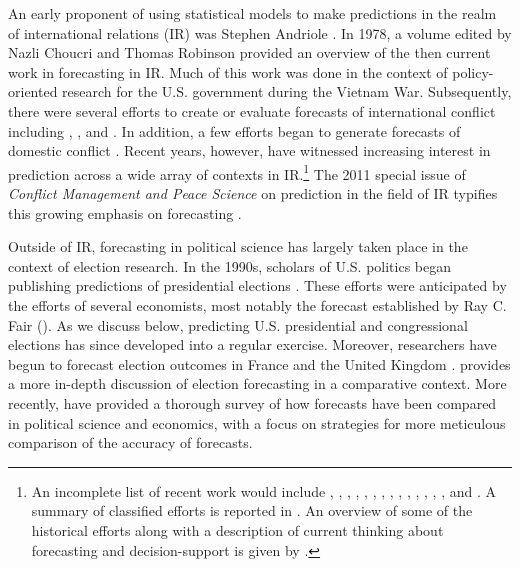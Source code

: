 \documentclass[pdftex,12pt,fullpage,oneside]{amsart}
\begin{document}
An early proponent of using statistical models to make predictions in
the realm of international relations (IR) was Stephen Andriole
\citep{Andriole:Young:1977}. In 1978, a volume edited by Nazli Choucri
and Thomas Robinson \nocite{Choucri:Robinson:1978} provided an
overview of the then current work in forecasting in IR.  Much of this
work was done in the context of policy-oriented research for the
U.S. government during the Vietnam War.  Subsequently, there were 
several efforts to create or evaluate forecasts of international
conflict including \citet{Freeman:Job:1979},
\citet{Singer:Wallace:1979}, and \citet{Vincent:1980}. In
addition, a few efforts began to generate forecasts of domestic
conflict \citep[e.g.,][]{Gurr:Lichbach:1986}.  Recent years,
however, have witnessed increasing interest in prediction across a
wide array of contexts in IR.\footnote{An incomplete list of recent
  work would include \citet{Krause:1997}, \citet{Davies:Gurr:1998},
  \citet{Pevehouse:Goldstein:1999}, \citet{Schrodt:Gerner:2000},
  \citet{King:Zeng:2001}, \citet{OBrien:2002}, \citet{BDM:2002},
  \citet{Fearon:Laitin:2003}, \citet{Demarchi:etal:2004}, \citet{Enders:Sandler:2005},
  \citet{Leblang:Satyanath:2006}, \citet{Ward:etal:2007},
  \citet{Brandt:etal:2008}, \citet{Bennett:Stam:2009}, and
  \citet{Gleditsch:Ward:2010}. A summary of classified efforts is
  reported in \citet{Feder:2002}.  An overview of some of the
  historical efforts along with a description of current thinking
  about forecasting and decision-support is given by
  \citet{OBrien:2010}.}  The 2011 special issue of \emph{Conflict
  Management and Peace Science} on prediction in the field of IR
typifies this growing emphasis on forecasting
\citep[c.f.,][]{Schneider_etal_2011, Mesquita_2011,
  Brandt_etal_2011}. 
  
Outside of IR, forecasting in political science has largely taken
place in the context of election research.  In the 1990s, scholars of
U.S. politics began publishing predictions of presidential elections
\citep{Campbell:1990, Campbell:1992}. These efforts were anticipated
by the efforts of several economists, most notably the forecast
established by Ray C. Fair (\citeyear{Fair:1978}). As we discuss
below, predicting U.S. presidential and congressional elections has
since developed into a regular exercise.  Moreover, researchers have
begun to forecast election outcomes in France
\citep[e.g.,][]{Jerome:1999} and the United Kingdom
\citep[e.g.,][]{Whitely:2005}. \citet{Lewis-Beck:2005} provides a more
in-depth discussion of election forecasting in a comparative context.
More recently, \citet{brandt:freeman:schrodt:2011} have provided a
thorough survey of how forecasts have been compared in political
science and economics, with a focus on strategies for more meticulous
comparison of the accuracy of forecasts.
\end{document}
